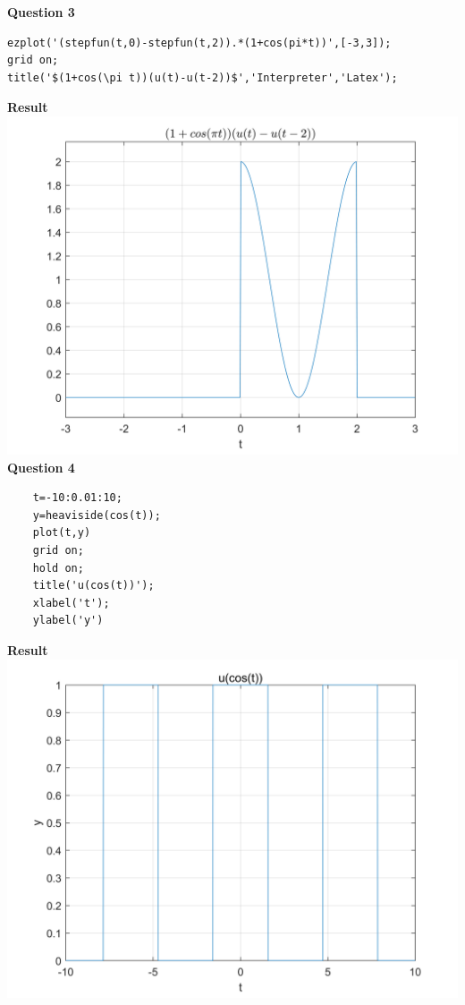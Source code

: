 \documentclass[UTF8,a4paper]{article}
\begin{document}
\textbf{Question 3}
\begin{lstlisting}
ezplot('(stepfun(t,0)-stepfun(t,2)).*(1+cos(pi*t))',[-3,3]);
grid on;
title('$(1+cos(\pi t))(u(t)-u(t-2))$','Interpreter','Latex');  
\end{lstlisting}
\textbf{Result}\\
\includegraphics[scale=0.65]{1-.png}\\
\textbf{Question 4}\\
\begin{lstlisting}
    t=-10:0.01:10;
    y=heaviside(cos(t));
    plot(t,y)
    grid on;
    hold on;
    title('u(cos(t))');
    xlabel('t');
    ylabel('y')
\end{lstlisting}
\textbf{Result}\\
\includegraphics[scale=0.6]{1-4.png}\\
\end{document}
